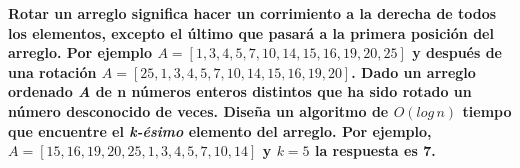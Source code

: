\textbf{Rotar un arreglo significa hacer un corrimiento a la derecha de 
todos los elementos, excepto el último que pasará a la primera posición
 del arreglo. Por ejemplo $A=[1,3,4,5,7,10,14,15,16,19,20,25]$ y después 
 de una rotación $A=[25,1,3,4,5,7,10,14,15,16,19,20]$. Dado un arreglo
 ordenado \textit{A} de n números enteros distintos que ha sido rotado un 
 número desconocido de veces. Diseña un algoritmo de $O(log \, n)$ tiempo
 que encuentre el \textit{k-ésimo} elemento del arreglo. Por ejemplo, $A=
 [15,16,19,20,25,1,3,4,5,7,10,14]$ y $k=5$ la respuesta es 7.}\\